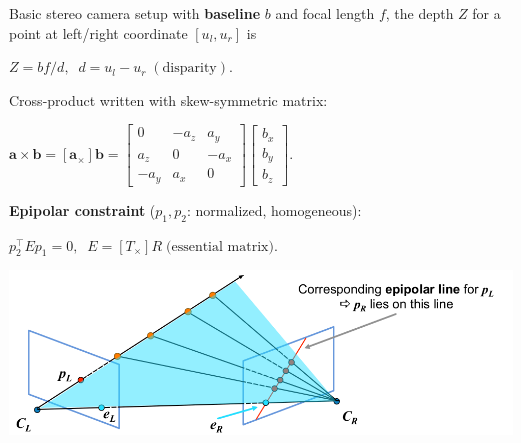 \documentclass[landscape]{article}
\newcommand{\vmspace}{\vspace{-7pt}}
\newcommand{\vpspace}{\vspace{5pt}}
\begin{document}
\begin{multicols}{3}
\begin{minipage}{\columnwidth}
  Basic stereo camera setup with \textbf{baseline} $b$ and focal length $f$, the
  depth $Z$ for a point at left/right coordinate $[u_l,u_r]$ is
  \vmspace
  \begin{center}
    $Z = bf/d,\;\;
    d = u_l - u_r\;(\text{disparity}).$
  \end{center}
\end{minipage}
\vpspace

\begin{minipage}{\columnwidth}
  Cross-product written with skew-symmetric matrix:
  \vmspace
  \begin{center}
    $
    \mathbf a \times \mathbf b = [\mathbf a_\times ] \mathbf b
    =
    \left[
    \begin{matrix}
      0 & -a_z & a_y \\
      a_z & 0 & - a_x \\
      -a_y & a_x & 0
    \end{matrix}
    \right]
    \left[
    \begin{matrix}
      b_x \\
      b_y \\
      b_z
    \end{matrix}
    \right].
    $
  \end{center}
\end{minipage}

\vpspace

\begin{minipage}{\columnwidth}
  \textbf{Epipolar constraint} ($p_1, p_2$: normalized, homogeneous):
  \vmspace
  \begin{center}
    $p_2^\intercal E p_1 = 0,\;\; E = [T_\times]R\;\text{(essential matrix)}.$
  \end{center}
  \vspace{-18pt}
  \begin{center}
    \includegraphics[width=0.9\columnwidth]{img/5_EpipolarConstraint.png}
  \end{center}
\end{minipage}


\end{multicols}
\end{document}
